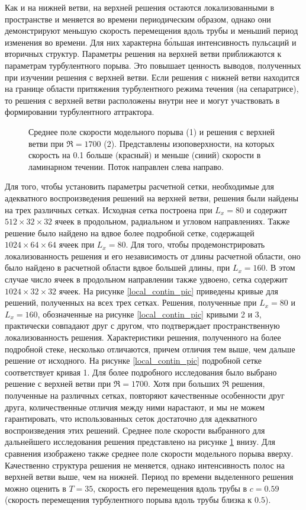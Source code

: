 Как и на нижней ветви, на верхней решения остаются локализованными в пространстве и меняется во времени периодическим образом, однако они демонстрируют меньшую скорость перемещения вдоль трубы и меньший период изменения во времени. Для них характерна б\'{о}льшая интенсивность пульсаций и вторичных структур. Параметры решения на верхней ветви приближаются к параметрам турбулентного порыва. Это повышает ценность выводов, полученных при изучении решения  с верхней ветви. Если решения с нижней ветви находится на границе области притяжения турбулентного режима течения (на сепаратрисе), то решения с верхней ветви расположены внутри нее и могут участвовать в формировании турбулентного аттрактора\cite{Avila2013}. 

\begin{figure}
\caption{Среднее поле скорости модельного порыва (1) и решения с верхней ветви при $\Re = 1700$ (2). Представлены изоповерхности, на которых скорость на 0.1 больше (красный) и меньше (синий) скорости в ламинарном течении. Поток направлен слева направо. }
\label{3D_contin_cmp_pic}
\end{figure}

Для того, чтобы установить параметры расчетной сетки, необходимые для адекватного воспроизведения решений на верхней ветви, решения были найдены на трех различных сетках. Исходная сетка построена при $L_x = 80$ и содержит $512 \times 32 \times 32$ ячеек в продольном, радиальном и угловом направлениях. Также решение было найдено на вдвое более подробной сетке, содержащей $1024 \times 64 \times 64$ ячеек при $L_x = 80$. Для того, чтобы продемонстрировать локализованность решения и его независимость от длины расчетной области, оно было найдено в расчетной области вдвое большей длины, при $L_x = 160$. В этом случае число ячеек в продольном направлении также удвоено, сетка содержит $1024 \times 32 \times 32$ ячеек. На рисунке \ref{local_contin_pic} приведены кривые для решений, полученных на всех трех сетках. Решения, полученные при $L_x = 80$ и $L_x = 160$, обозначенные на рисунке \ref{local_contin_pic} кривыми 2 и 3, практически совпадают друг с другом, что подтверждает пространственную локализованность решения. Характеристики решения, полученного на более подробной стеке, несколько отличаются, причем отличия тем выше, чем дальше решение от исходного. На рисунке \ref{local_contin_pic} подробной сетке соответствует кривая 1. Для более подробного исследования было выбрано решение с верхней ветви при $\Re = 1700$. Хотя при больших $\Re$ решения, полученные на различных сетках, повторяют качественные особенности друг друга, количественные отличия между ними нарастают, и мы не можем гарантировать, что использованных сеток достаточно для адекватного воспроизведения этих решений. Среднее поле скорости выбранного для дальнейшего исследования решения представлено на рисунке \ref{3D_contin_cmp_pic} внизу. Для сравнения изображено также среднее поле скорости модельного порыва вверху. Качественно структура решения не меняется, однако интенсивность полос на верхней ветви выше, чем на нижней. Период по времени выделенного решения можно оценить в $T = 35$, скорость его перемещения вдоль трубы в $c = 0.59$ (скорость перемещения турбулентного порыва вдоль трубы близка к $0.5$). 


